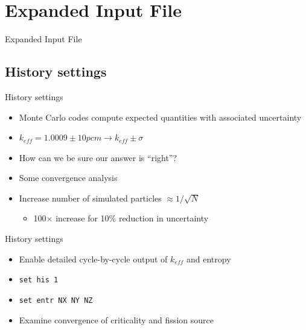 \documentclass{beamer}
\begin{document}
\section{Expanded Input File}

\begin{frame}{Expanded Input File}
    \tableofcontents[sectionstyle=show/hide,subsectionstyle=show/show/hide]
\end{frame}

\subsection{History settings}

\begin{frame}{History settings}
    \begin{itemize}
        \item Monte Carlo codes compute expected quantities with associated uncertainty
        \item $k_{eff}=1.0009\pm 10 pcm \rightarrow k_{eff} \pm \sigma$
        \item How can we be sure our answer is ``right''?
        \item Some convergence analysis
        \item Increase number of simulated particles $\approx 1/\sqrt{N}$
        \begin{itemize}
            \item 100$\times$ increase for 10\% reduction in uncertainty
        \end{itemize}
    \end{itemize}
\end{frame}

\begin{frame}{History settings}
    \begin{itemize}
        \item Enable detailed cycle-by-cycle output of $k_{eff}$ and entropy
        \item \texttt{set his 1}
        \item \texttt{set entr NX NY NZ}
        \item Examine convergence of criticality and fission source
    \end{itemize}
\end{frame}
\end{document}
